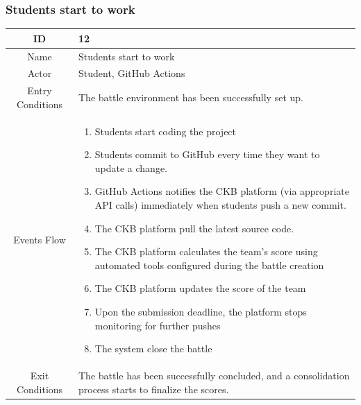 \subsubsection{Students start to work}
\begin{longtable}{|c| p{10cm}|}
        \hline
            ID & 12 \\
        \hline
            Name & Students start to work \\
        \hline
            Actor & Student, GitHub Actions\\
        \hline
            Entry Conditions & 
              The battle environment has been successfully set up.
            
                     
        
         \\
        \hline
            Events Flow &   \begin{enumerate}
                              \item Students start coding the project 
                              \item Students commit to GitHub every time they want to update a change.
                                \item GitHub Actions notifies the CKB platform (via appropriate API calls) immediately when students push a new commit.
                                \item The CKB platform  pull the latest source code.
                                \item  The CKB platform calculates the team's score using automated tools configured during the battle creation
                                \item  The CKB platform updates the score of the team
                                \item Upon the submission deadline, the  platform stops monitoring for further pushes
                                \item The system close  the battle 
                            \end{enumerate} \\
                            \hline
            Exit Conditions &
    
                               The battle has been successfully concluded, and a consolidation process starts to finalize the scores.
                                \\
        \hline
            
    \end{longtable}

